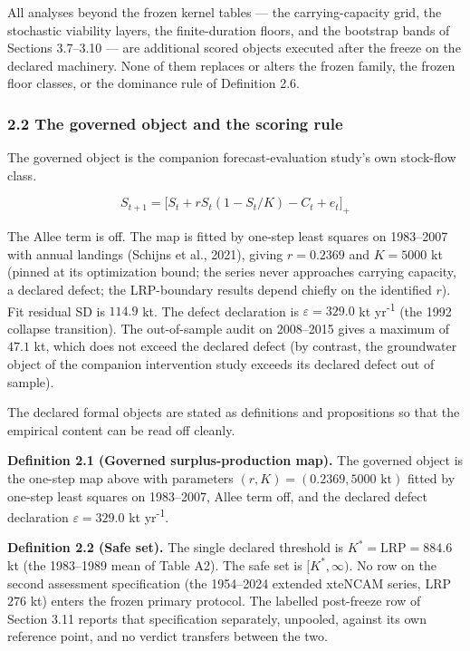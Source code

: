\documentclass[11pt]{article}
\begin{document}
All analyses beyond the frozen kernel tables --- the carrying-capacity
grid, the stochastic viability layers, the finite-duration floors, and
the bootstrap bands of Sections 3.7--3.10 --- are additional scored
objects executed after the freeze on the declared machinery. None of
them replaces or alters the frozen family, the frozen floor classes, or
the dominance rule of Definition 2.6.

\subsubsection{2.2 The governed object and the scoring
rule}\label{the-governed-object-and-the-scoring-rule}

The governed object is the companion forecast-evaluation study's own
stock-flow class.

\[S_{t+1}=\bigl[S_t+rS_t(1-S_t/K)-C_t+e_t\bigr]_+\]

The Allee term is off. The map is fitted by one-step least squares on
1983--2007 with annual landings (Schijns et al., 2021), giving
\(r = 0.2369\) and \(K = 5000\) kt (pinned at its optimization bound;
the series never approaches carrying capacity, a declared defect; the
LRP-boundary results depend chiefly on the identified \(r\)). Fit
residual SD is \(114.9\) kt. The defect declaration is
\(\varepsilon = 329.0\) kt yr\textsuperscript{-1} (the 1992 collapse transition). The
out-of-sample audit on 2008--2015 gives a maximum of \(47.1\) kt, which
does not exceed the declared defect (by contrast, the groundwater object
of the companion intervention study exceeds its declared defect out of
sample).

The declared formal objects are stated as definitions and propositions
so that the empirical content can be read off cleanly.

\textbf{Definition 2.1 (Governed surplus-production map).} The governed
object is the one-step map above with parameters
\((r, K) = (0.2369, 5000\text{ kt})\) fitted by one-step least squares
on 1983--2007, Allee term off, and the declared defect declaration
\(\varepsilon = 329.0\) kt yr\textsuperscript{-1}.

\textbf{Definition 2.2 (Safe set).} The single declared threshold is
\(K^* = \mathrm{LRP} = 884.6\) kt (the 1983--1989 mean of Table A2). The
safe set is \([K^*, \infty)\). No row on the second assessment
specification (the 1954--2024 extended xteNCAM series, LRP \(276\) kt)
enters the frozen primary protocol. The labelled post-freeze row of
Section 3.11 reports that specification separately, unpooled, against
its own reference point, and no verdict transfers between the two.
\end{document}
